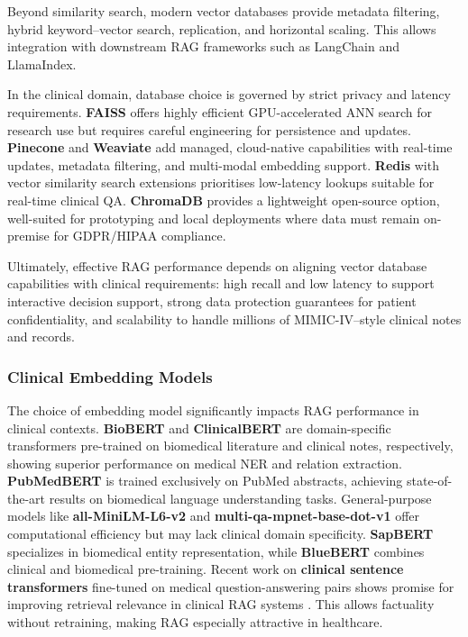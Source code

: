 Beyond similarity search, modern vector databases provide metadata filtering, hybrid keyword–vector search, replication, and horizontal scaling. This allows integration with downstream RAG frameworks such as LangChain and LlamaIndex. 

In the clinical domain, database choice is governed by strict privacy and latency requirements. \textbf{FAISS} offers highly efficient GPU-accelerated ANN search for research use but requires careful engineering for persistence and updates. \textbf{Pinecone} and \textbf{Weaviate} add managed, cloud-native capabilities with real-time updates, metadata filtering, and multi-modal embedding support. \textbf{Redis} with vector similarity search extensions prioritises low-latency lookups suitable for real-time clinical QA. \textbf{ChromaDB} provides a lightweight open-source option, well-suited for prototyping and local deployments where data must remain on-premise for GDPR/HIPAA compliance.

Ultimately, effective RAG performance depends on aligning vector database capabilities with clinical requirements: high recall and low latency to support interactive decision support, strong data protection guarantees for patient confidentiality, and scalability to handle millions of MIMIC-IV–style clinical notes and records.


\subsubsection{Clinical Embedding Models}
The choice of embedding model significantly impacts RAG performance in clinical contexts. \textbf{BioBERT} \citep{lee2020biobert} and \textbf{ClinicalBERT} \citep{alsentzer2019clinicalbert} are domain-specific transformers pre-trained on biomedical literature and clinical notes, respectively, showing superior performance on medical NER and relation extraction. \textbf{PubMedBERT} \citep{gu2021pubmedbert} is trained exclusively on PubMed abstracts, achieving state-of-the-art results on biomedical language understanding tasks. General-purpose models like \textbf{all-MiniLM-L6-v2} and \textbf{multi-qa-mpnet-base-dot-v1} \citep{reimers2019sentencebert} offer computational efficiency but may lack clinical domain specificity. \textbf{SapBERT} \citep{liu2021sapbert} specializes in biomedical entity representation, while \textbf{BlueBERT} \citep{peng2019bluebert} combines clinical and biomedical pre-training. Recent work on \textbf{clinical sentence transformers} fine-tuned on medical question-answering pairs shows promise for improving retrieval relevance in clinical RAG systems \citep{zhang2023clinical}.
This allows factuality without retraining, making RAG especially attractive in healthcare.

